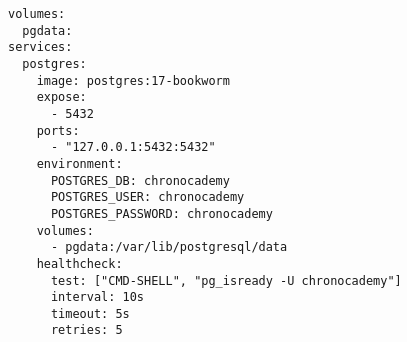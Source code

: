 \begin{verbatim}
volumes:
  pgdata:
services:
  postgres:
    image: postgres:17-bookworm
    expose:
      - 5432
    ports:
      - "127.0.0.1:5432:5432"
    environment:
      POSTGRES_DB: chronocademy
      POSTGRES_USER: chronocademy
      POSTGRES_PASSWORD: chronocademy
    volumes:
      - pgdata:/var/lib/postgresql/data
    healthcheck:
      test: ["CMD-SHELL", "pg_isready -U chronocademy"]
      interval: 10s
      timeout: 5s
      retries: 5
\end{verbatim}
